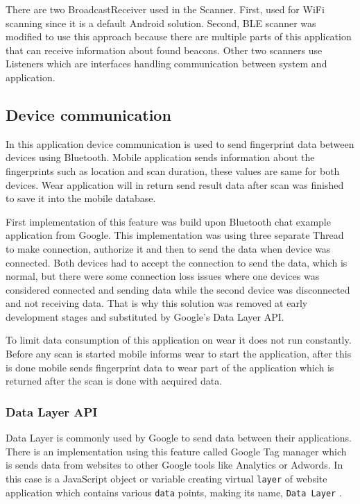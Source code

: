 There are two BroadcastReceiver used in the Scanner. First, used for WiFi scanning since it is a default Android solution. Second, BLE scanner was modified to use this approach because there are multiple parts of this application that can receive information about found beacons. Other two scanners use Listeners which are interfaces handling communication between system and application.

\subsection{Device communication}\label{subsec:DeviceCommunication}
In this application device communication is used to send fingerprint data between devices using Bluetooth. Mobile application sends information about the fingerprints such as location and scan duration, these values are same for both devices. Wear application will in return send result data after scan was finished to save it into the mobile database.

First implementation of this feature was build upon Bluetooth chat example application from Google. This implementation was using three separate Thread to make connection, authorize it and then to send the data when device was connected. Both devices had to accept the connection to send the data, which is normal, but there were some connection loss issues where one devices was considered connected and sending data while the second device was disconnected and not receiving data. That is why this solution was removed at early development stages and substituted by Google's Data Layer API.

To limit data consumption of this application on wear it does not run constantly. Before any scan is started mobile informs wear to start the application, after this is done mobile sends fingerprint data to wear part of the application which is returned after the scan is done with acquired data.


\subsubsection{Data Layer API}\label{subsec:DataLayerAPI}
Data Layer is commonly used by Google to send data between their applications. There is an implementation using this feature called Google Tag manager which is sends data from websites to other Google tools like Analytics or Adwords. In this case is a JavaScript object or variable creating virtual \verb|layer| of website application which contains various \verb|data| points, making its name, \verb|Data Layer| \cite{GTMDL}.

